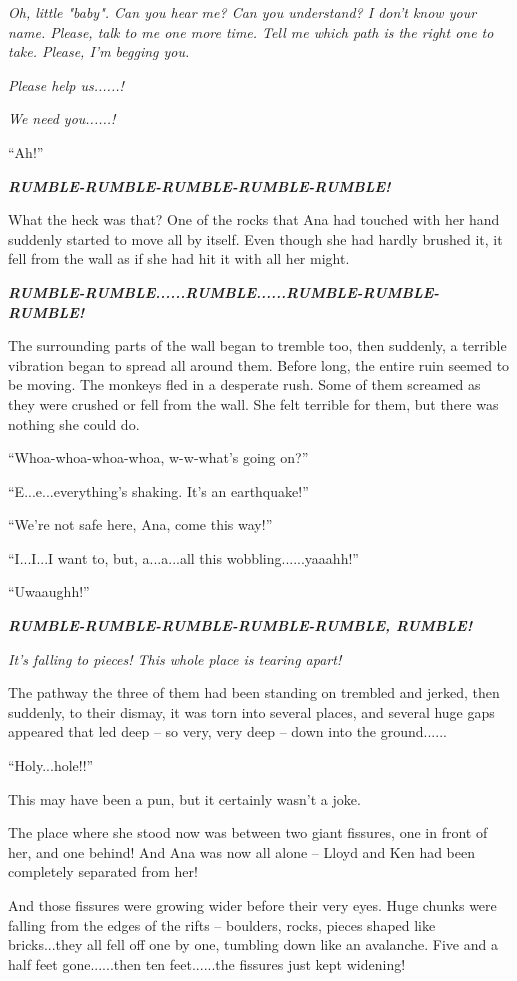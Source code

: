 \documentclass[
]{article}
\begin{document}
\emph{Oh, little "baby". Can you hear me? Can you understand? I don't
know your name. Please, talk to me one more time. Tell me which path is
the right one to take. Please, I'm begging you.}

\emph{Please help us......!}

\emph{We need you......!}

``Ah!''

\emph{\textbf{RUMBLE-RUMBLE-RUMBLE-RUMBLE-RUMBLE!}}

What the heck was that? One of the rocks that Ana had touched with her
hand suddenly started to move all by itself. Even though she had hardly
brushed it, it fell from the wall as if she had hit it with all her
might.

\emph{\textbf{RUMBLE-RUMBLE......RUMBLE......RUMBLE-RUMBLE-RUMBLE!}}

The surrounding parts of the wall began to tremble too, then suddenly, a
terrible vibration began to spread all around them. Before long, the
entire ruin seemed to be moving. The monkeys fled in a desperate rush.
Some of them screamed as they were crushed or fell from the wall. She
felt terrible for them, but there was nothing she could do.

``Whoa-whoa-whoa-whoa, w-w-what's going on?''

``E...e...everything's shaking. It's an earthquake!''

``We're not safe here, Ana, come this way!''

``I...I...I want to, but, a...a...all this wobbling......yaaahh!''

``Uwaaughh!''

\emph{\textbf{RUMBLE-RUMBLE-RUMBLE-RUMBLE-RUMBLE, RUMBLE!}}

\emph{It's falling to pieces! This whole place is tearing apart!}

The pathway the three of them had been standing on trembled and jerked,
then suddenly, to their dismay, it was torn into several places, and
several huge gaps appeared that led deep -- so very, very deep -- down
into the ground......

``Holy...hole!!''

This may have been a pun, but it certainly wasn't a joke.

The place where she stood now was between two giant fissures, one in
front of her, and one behind! And Ana was now all alone -- Lloyd and Ken
had been completely separated from her!

And those fissures were growing wider before their very eyes. Huge
chunks were falling from the edges of the rifts -- boulders, rocks,
pieces shaped like bricks...they all fell off one by one, tumbling down
like an avalanche. Five and a half feet gone......then ten feet......the
fissures just kept widening!
\end{document}
